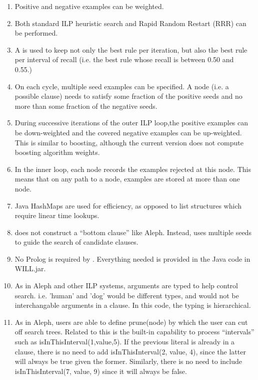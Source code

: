 \documentclass{article}
\begin{document}
\begin{enumerate}
\item Positive and negative examples can be weighted.
\item Both standard ILP heuristic search and Rapid Random Restart (RRR) can be performed.
\item A \gleaner is used to keep not only the best rule per iteration, but also the best rule per interval of recall (i.e. the best rule whose recall is between 0.50 and 0.55.)~\cite{goadrichmlj06}
\item On each cycle, multiple seed examples can be specified.  A node (i.e. a possible clause) needs to satisfy some fraction of the positive seeds and no more than some fraction of the negative seeds.
\item During successive iterations of the outer ILP loop,the positive examples can be down-weighted and the covered negative examples can be up-weighted.  This is similar to boosting, although the current version does not compute boosting algorithm weights.
\item In the inner loop, each node records the examples rejected at this node.  This means that on any path to a node, examples are stored at more than one node.
\item Java HashMaps are used for efficiency, as opposed to list structures which require linear time lookups.
\item \will does not construct a ``bottom clause'' like Aleph.  Instead, \will uses multiple seeds to guide the search of candidate clauses.
\item No Prolog is required by \will.  Everything needed is provided in the Java code in WILL.jar.
\item As in Aleph and other ILP systems, arguments are typed to help control search. i.e. 'human' and 'dog' would be different types, and would not be interchangable arguments in a clause.   In this code, the typing is hierarchical.
\item As in Aleph, users are able to define prune(node) by which the user can cut off search trees.  Related to this is the built-in capability to process ``intervals'' such as isInThisInterval(1,value,5).  If the previous literal is already in a clause, there is no need to add isInThisInterval(2, value, 4), since the latter will always be true given the former.  Similarly, there is no need to include isInThisInterval(7, value, 9) since it will always be false.  
\end{enumerate}
\end{document}
